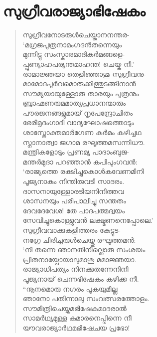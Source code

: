 
\section{സുഗ്രീവരാജ്യാഭിഷേകം}

\begin{verse}
സുഗ്രീവനോടരുള്‍ചെയ്താനനന്തര-\\
‘മഗ്രജപുത്രനാമംഗദന്‍തന്നെയും\\
മുന്നിട്ടു സംസ്കാരമാദികര്‍മങ്ങളെ-\\
പ്പുണ്യാഹപര്യന്തമാഹന്ത! ചെയ്ക നീ.’\\
രാമാജ്ഞയാ തെളിഞ്ഞാശു സുഗ്രീവനു-\\
മാമോദപൂര്‍വമൊരുക്കിത്തുടങ്ങിനാന്‍\\
സൗമ്യയായുള്ളോരു താരയും പുത്രനും\\
ബ്രാഹ്മണരുമമാത്യപ്രധാനന്മാരും\\
പൗരജനങ്ങളുമായ് നൃപേന്ദ്രോചിതം\\
ഭേരീമൃദംഗാദി വാദ്യഘോഷത്തൊടും\\
ശാസ്ത്രോക്തമാര്‍ഗേണ കര്‍മം കഴിച്ചഥ\\
സ്നാനാത്വാ ജഗാമ രഘൂത്തമസന്നിധൗ.\\
മന്ത്രികളോടും പ്രണമ്യ പാദാംബുജ-\\
മന്തര്‍മുദാ പറഞ്ഞാന്‍ കപിപുംഗവന്‍:\\
‘രാജ്യത്തെ രക്ഷിച്ചുകൊള്‍കവേണമിനി\\
പൂജ്യനാകും നിന്തിരുവടി സാദരം.\\
ദാസനായുള്ളോരടിയനിനിത്തവ\\
ശാസനയും പരിപാലിച്ചു സന്തതം\\
ദേവദേവേശ! തേ പാദപത്മദ്വയം\\
സേവിച്ചുകൊള്ളുവന്‍ ലക്ഷ്മണനെപ്പോലെ.’\\
സുഗ്രീവവാക്കുകളിത്തരം കേട്ടുട-\\
നഗ്രേ ചിരിച്ചരുള്‍ചെയ്തു രഘൂത്തമന്‍:\\
‘നീ തന്നെ ഞാനതിനില്ലൊരു സംശയം\\
പ്രീതനായ്പോയാലുമാശു മമാജ്ഞയാ.\\
രാജ്യാധിപത്യം നിനക്കുതന്നേനിനി\\
പൂജ്യനായ് ചെന്നഭിഷേകം കഴിക്ക നീ.\\
“നൂനമൊരു നഗരം പൂകയുമില്ല\\
ഞാനോ പതിന്നാലു സംവത്സരത്തോളം.\\
സൗമിത്രിചെയ്യുമഭിഷേകമാദരാല്‍\\
സാമര്‍ഥ്യമുള്ള കുമാരനെപ്പിന്നെ നീ\\
യൗവരാജ്യാര്‍ഥമഭിഷേചയ പ്രഭോ!\\

\end{verse}
